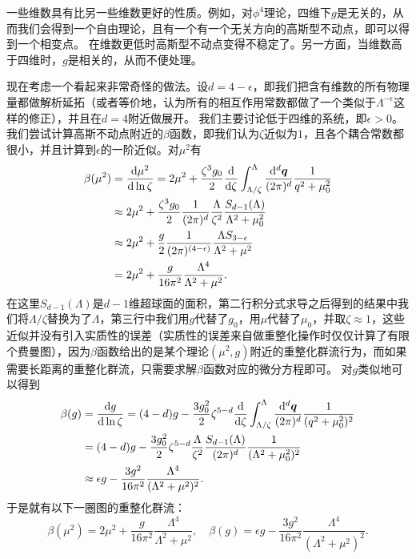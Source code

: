 \documentclass[hyperref, UTF8, a4paper]{ctexart}
\begin{document}
一些维数具有比另一些维数更好的性质。例如，对$\phi^4$理论，四维下$g$是无关的，从而我们会得到一个自由理论，且有一个有一个无关方向的高斯型不动点，即可以得到一个相变点。
在维数更低时高斯型不动点变得不稳定了。另一方面，当维数高于四维时，$g$是相关的，从而不便处理。

现在考虑一个看起来非常奇怪的做法。设$d=4 - \epsilon$，即我们把含有维数的所有物理量都做解析延拓（或者等价地，认为所有的相互作用常数都做了一个类似于$\Lambda^{-\epsilon}$这样的修正），并且在$d=4$附近做展开。
我们主要讨论低于四维的系统，即$\epsilon>0$。
我们尝试计算高斯不动点附近的$\beta$函数，即我们认为$\zeta$近似为$1$，且各个耦合常数都很小，并且计算到$\epsilon$的一阶近似。对$\mu^2$有
\[
    \begin{aligned}
        \beta(\mu^2) &= \dv{\mu^2}{\ln \zeta} = 2 \mu^2 + \frac{\zeta^3 g_0}{2} \dv{\zeta}  \int^\Lambda_{\Lambda/\zeta} \frac{\dd[d]{\vb*{q}}}{(2\pi)^d} \frac{1}{q^2 + \mu_0^2} \\
        &\approx 2 \mu^2 + \frac{\zeta^3 g_0}{2} \frac{1}{(2\pi)^d} \frac{\Lambda}{\zeta^2}  \frac{S_{d-1}(\Lambda)}{\Lambda^2 + \mu_0^2} \\
        &\approx 2 \mu^2 + \frac{g}{2} \frac{1}{(2\pi)^{(4-\epsilon)}} \frac{\Lambda S_{3-\epsilon}}{\Lambda^2 + \mu^2} \\
        &= 2 \mu^2 + \frac{g}{16 \pi^2} \frac{\Lambda^4}{\Lambda^2 + \mu^2}.
    \end{aligned}
\]
在这里$S_{d-1}(\Lambda)$是$d-1$维超球面的面积，第二行积分式求导之后得到的结果中我们将$\Lambda / \zeta$替换为了$\Lambda$，第三行中我们用$g$代替了$g_0$，用$\mu$代替了$\mu_0$，并取$\zeta \approx 1$，这些近似并没有引入实质性的误差（实质性的误差来自做重整化操作时仅仅计算了有限个费曼图），因为$\beta$函数给出的是某个理论$(\mu^2, g)$附近的重整化群流行为，而如果需要长距离的重整化群流，只需要求解$\beta$函数对应的微分方程即可。
对$g$类似地可以得到
\[
    \begin{aligned}
        \beta(g) &= \dv{g}{\ln \zeta} = (4-d) g - \frac{3 g_0^2}{2} \zeta^{5-d} \dv{\zeta} \int^\Lambda_{\Lambda/\zeta} \frac{\dd[d]{\vb*{q}}}{(2\pi)^d} \frac{1}{(q^2 + \mu_0^2)^2} \\
        &= (4-d) g - \frac{3 g_0^2}{2} \zeta^{5-d} \frac{\Lambda}{\zeta^2} \frac{S_{d-1}(\Lambda)}{(2\pi)^d} \frac{1}{(\Lambda^2 + \mu_0^2)^2} \\
        &\approx \epsilon g - \frac{3 g^2}{16 \pi^2} \frac{\Lambda^4}{(\Lambda^2 + \mu^2)^2}.
    \end{aligned}
\]
于是就有以下一圈图的重整化群流：
\begin{equation}
    \beta(\mu^2) = 2 \mu^2 + \frac{g}{16 \pi^2} \frac{\Lambda^4}{\Lambda^2 + \mu^2}, \quad \beta(g) = \epsilon g - \frac{3 g^2}{16 \pi^2} \frac{\Lambda^4}{(\Lambda^2 + \mu^2)^2}.
    \label{eq:rg-flow-near-gaussian}
\end{equation}
\end{document}
